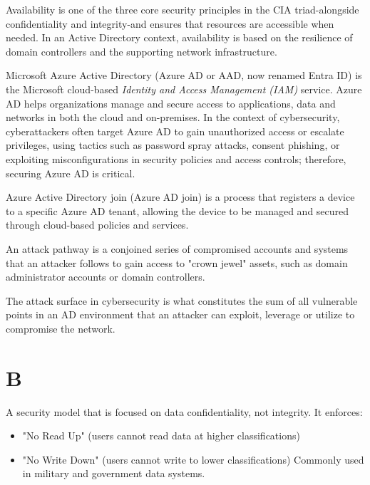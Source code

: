  Availability is one of the three core security principles in the CIA triad-alongside confidentiality and integrity-and ensures that resources are accessible when needed. In an Active Directory context, availability is based on the resilience of domain controllers and the supporting network infrastructure.

 Microsoft Azure Active Directory (Azure AD or AAD, now renamed Entra ID) is the Microsoft cloud-based \textit{Identity and Access Management (IAM)} service. Azure AD helps organizations manage and secure access to applications, data and networks in both the cloud and on-premises. In the context of cybersecurity, cyberattackers often target Azure AD to gain unauthorized access or escalate privileges, using tactics such as password spray attacks, consent phishing, or exploiting misconfigurations in security policies and access controls; therefore, securing Azure AD is critical.

 Azure Active Directory join (Azure AD join) is a process that registers a device to a specific Azure AD tenant, allowing the device to be managed and secured through cloud-based policies and services.

 An attack pathway is a conjoined series of compromised accounts and systems that an attacker follows to gain access to "crown jewel" assets, such as domain administrator accounts or domain controllers.

 The attack surface in cybersecurity is what constitutes the sum of all vulnerable points in an AD environment that an attacker can exploit, leverage or utilize to compromise the network.

\section*{B}
 A security model that is focused on data confidentiality, not integrity. It enforces:
\begin{itemize}
    \item "No Read Up" (users cannot read data at higher classifications)
    \item "No Write Down" (users cannot write to lower classifications)
Commonly used in military and government data systems.

\end{itemize}

